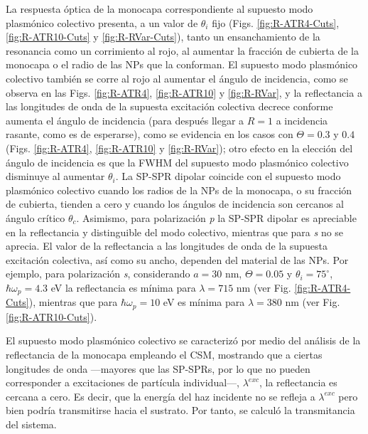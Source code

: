 La respuesta óptica de la monocapa correspondiente al supuesto modo plasmónico colectivo presenta, a un valor de $\theta_i$ fijo (Figs. \ref{fig:R-ATR4-Cuts}, \ref{fig:R-ATR10-Cuts} y \ref{fig:R-RVar-Cuts}), tanto un ensanchamiento de la resonancia como un corrimiento al rojo, al aumentar la fracción de cubierta de la monocapa o el radio de las NPs que la conforman. El supuesto modo plasmónico colectivo también se corre al rojo al aumentar el ángulo de incidencia, como se observa en las Figs. \ref{fig:R-ATR4}, \ref{fig:R-ATR10} y \ref{fig:R-RVar}, y la reflectancia a las longitudes de onda de la supuesta excitación colectiva decrece conforme aumenta el ángulo de incidencia (para después llegar a $R=1$ a incidencia rasante, como es de esperarse), como se evidencia en los casos con $\Theta=0.3$ y $0.4$ (Figs. \ref{fig:R-ATR4}, \ref{fig:R-ATR10} y \ref{fig:R-RVar}); otro efecto en la elección del ángulo de incidencia es que la FWHM del supuesto modo plasmónico colectivo disminuye al aumentar $\theta_i$. La SP-SPR dipolar coincide con el supuesto modo plasmónico colectivo cuando los radios de la NPs de la monocapa, o su fracción de cubierta, tienden a cero y cuando los ángulos de incidencia son cercanos al ángulo crítico $\theta_c$. Asimismo, para polarización \emph{p} la SP-SPR dipolar es apreciable en la reflectancia y distinguible del modo colectivo, mientras que para \emph{s} no se aprecia. El valor de la reflectancia a las longitudes de onda de la supuesta excitación colectiva, así como su ancho, dependen del material de las NPs. Por ejemplo, para polarización \emph{s}, considerando  $a=30$ nm, $\Theta=0.05$ y $\theta_i=75^\circ$, $\hbar\omega_p=4.3$ eV la reflectancia es mínima para $\lambda=715$ nm  (ver Fig. \ref{fig:R-ATR4-Cuts}), mientras que para $\hbar\omega_p=10$ eV es mínima para $\lambda=380$ nm (ver Fig. \ref{fig:R-ATR10-Cuts}).

El supuesto modo plasmónico colectivo se caracterizó por medio del análisis de la reflectancia de la monocapa empleando el CSM, mostrando que a ciertas longitudes de onda ---mayores que las SP-SPRs, por lo que no pueden corresponder a excitaciones de partícula individual---, $\lambda^{exc}$, la reflectancia es cercana a cero. Es decir, que la energía del haz incidente no se refleja a $\lambda^{exc}$ pero bien podría transmitirse hacia el sustrato. Por tanto, se calculó la transmitancia del sistema. 

